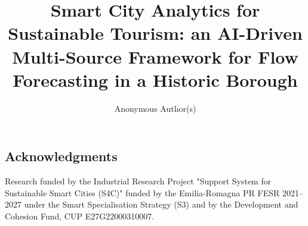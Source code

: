 \documentclass[runningheads]{llncs}
\begin{document}
\title{Smart City Analytics for Sustainable Tourism: an AI-Driven Multi-Source Framework for Flow  Forecasting in a Historic Borough}

\author{Anonymous Author(s)}
\institute{}

\maketitle







\begingroup
\color{red}

\endgroup

\subsection*{Acknowledgments}
\scriptsize
Research funded by the Industrial Research Project "Support System for Sustainable Smart Cities (S4C)" funded by the Emilia-Romagna PR FESR 2021–2027 under the Smart Specialisation Strategy (S3) and by the Development and Cohesion Fund, CUP E27G22000310007.
\begingroup
\scriptsize


\endgroup
\end{document}
